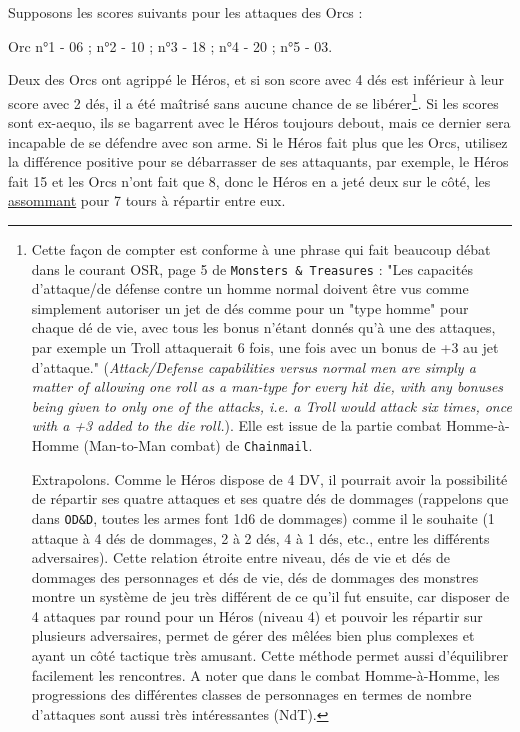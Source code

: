 \medskip

Supposons les scores suivants pour les attaques des Orcs :

\medskip

Orc n°1 - 06 ; n°2 - 10 ; n°3 - 18 ; n°4 - 20 ; n°5 - 03.

\medskip

Deux des Orcs ont agrippé le Héros, et si son score avec 4 dés est inférieur à leur score avec 2 dés, il a été maîtrisé sans aucune chance de se libérer\footnote{
    Cette façon de compter est conforme à une phrase qui fait beaucoup débat dans le courant OSR, page 5 de \texttt{Monsters \& Treasures} :  "Les capacités d'attaque/de défense contre un homme normal doivent être vus comme simplement autoriser un jet de dés comme pour un "type homme" pour chaque dé de vie, avec tous les bonus n'étant donnés qu'à une des attaques, par exemple un Troll attaquerait 6 fois, une fois avec un bonus de +3 au jet d'attaque." (\textit{Attack/Defense capabilities versus normal men are simply a matter of allowing one roll as a man-type for every hit die, with any bonuses being given to only one of the attacks, i.e. a Troll would attack six times, once with a +3 added to the die roll.}). Elle est issue de la partie combat Homme-à-Homme (Man-to-Man combat) de \texttt{Chainmail}.

    Extrapolons. Comme le Héros dispose de 4 DV, il pourrait avoir la possibilité de répartir ses quatre attaques et ses quatre dés de dommages (rappelons que dans \texttt{OD\&D}, toutes les armes font 1d6 de dommages) comme il le souhaite (1 attaque à 4 dés de dommages, 2 à 2 dés, 4 à 1 dés, etc., entre les différents adversaires). Cette relation étroite entre niveau, dés de vie et dés de dommages des personnages et dés de vie, dés de dommages des monstres montre un système de jeu très différent de ce qu'il fut ensuite, car disposer de 4 attaques par round pour un Héros (niveau 4) et pouvoir les répartir sur plusieurs adversaires, permet de gérer des mêlées bien plus complexes et ayant un côté tactique très amusant. Cette méthode permet aussi d'équilibrer facilement les rencontres. A noter que dans le  combat Homme-à-Homme, les progressions des différentes classes de personnages en termes de nombre d'attaques sont aussi très intéressantes (NdT).
}. Si les scores sont ex-aequo, ils se bagarrent avec le Héros toujours debout, mais ce dernier sera incapable de se défendre avec son arme. Si le Héros fait plus que les Orcs, utilisez la différence positive pour se débarrasser de ses attaquants, par exemple, le Héros fait 15 et les Orcs n'ont fait que 8, donc le Héros en a jeté deux sur le côté, les \uline{assommant} pour 7 tours à répartir entre eux.


